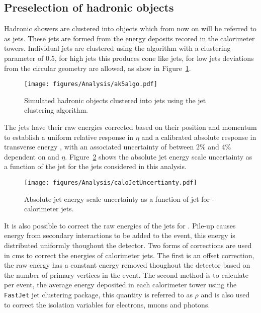 \subsection{Preselection of hadronic objects} %
\label{sub:Preselection_of_hadronic_objects}
Hadronic showers are clustered into objects which from now on will be referred 
to as jets. These jets are formed from the energy deposits recored in the 
calorimeter towers. Individual jets are clustered using the \AK 
algorithm with a clustering parameter of 0.5, for high \PT jets this produces cone like jets, for low \PT jets deviations from the circular geometry are allowed, as show in Figure~\ref{fig:figures_Analysis_ak5algo}.

\begin{figure}[htbp]
  \centering
    \texttt{[image: figures/Analysis/ak5algo.pdf]}
  \caption{Simulated hadronic objects clustered into jets using the \AK jet 
  clustering algorithm.}
  \label{fig:figures_Analysis_ak5algo}
\end{figure}
The jets have their raw energies corrected based on their position and momentum 
to establish a uniform relative response in $\eta$ and a calibrated absolute 
response in transverse energy \ET, with an associated uncertainty of between 
2$\%$ and 4$\%$ dependent  on \ET and $\eta$. 
Figure~\ref{fig:figures_Analysis_caloJetUncertianty} shows the absolute jet 
energy scale uncertainty as a function of the jet \PT for the jets considered 
in this analysis.

\begin{figure}[htbp]
  \centering
    \texttt{[image: figures/Analysis/caloJetUncertianty.pdf]}
  \caption{Absolute jet energy scale uncertainty as a function of jet \PT for \AK-calorimeter jets.}
  \label{fig:figures_Analysis_caloJetUncertianty}
\end{figure}

It is also possible to correct the raw energies of the jets for \pu. Pile-up 
causes energy from secondary interactions to be added to the event, this 
energy is distributed uniformly thoughout the detector. Two forms of \pu 
corrections are used in \ac{cms} to correct the energies of calorimeter jets. 
The first is an offset correction, the raw energy has a constant energy removed 
thoughout the detector based on the number of primary vertices in the event. 
The second method is to calculate per event, the average energy deposited in 
each calorimeter tower using the 
\texttt{FastJet} jet clustering package, 
this quantity is referred to as $\rho$ and is also used to correct the 
isolation variables for electrons, muons and photons.


